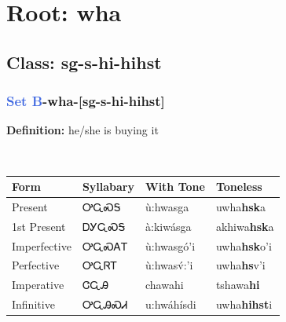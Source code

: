 \needspace{4in}
\section*{Root: wha}
\nopagebreak
{}
\needspace{3in}
\subsection*{Class: sg-s-hi-hihst}
\nopagebreak
\needspace{2in}
\subsubsection*{\textcolor{RoyalBlue}{Set B}{-}\textbf{wha}{-}[sg-s-hi-hihst]}
\nopagebreak
\textbf{Definition: } he/she is buying it
\\[0.5em]
\begin{tabularx}{\textwidth}{l X X X}%
\toprule%
\textbf{Form}&\textbf{Syllabary}&\textbf{With Tone}&\textbf{Toneless}\\%
\midrule%
Present&ᎤᏩᏍᎦ&ù:hwasga&uwha\textbf{hsk}a\\%
1st Present&ᎠᎩᏩᏍᎦ&à:kiwásga&akhiwa\textbf{hsk}a\\%
Imperfective&ᎤᏩᏍᎪᎢ&ù:hwasgó’i&uwha\textbf{hsk}o'i\\%
Perfective&ᎤᏩᏒᎢ&ù:hwasv́:’i&uwha\textbf{hs}v'i\\%
Imperative&ᏣᏩᎯ&chawahi&tshawa\textbf{hi}\\%
Infinitive&ᎤᏩᎯᏍᏗ&u:hwáhísdi&uwha\textbf{hihst}i\\%
\bottomrule%
\end{tabularx}
\\[1em]